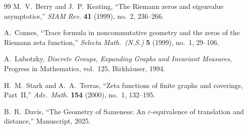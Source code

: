 \documentclass[12pt,reqno]{amsart}
\theoremstyle{plain}
\theoremstyle{definition}
\theoremstyle{remark}
\begin{document}
\begin{thebibliography}{99}
M.~V.~Berry and J.~P.~Keating,
``The Riemann zeros and eigenvalue asymptotics,''
\emph{SIAM Rev.} \textbf{41} (1999), no.~2, 236--266.

A.~Connes,
``Trace formula in noncommutative geometry and the zeros of the
Riemann zeta function,''
\emph{Selecta Math.~(N.S.)} \textbf{5} (1999), no.~1, 29--106.

A.~Lubotzky,
\emph{Discrete Groups, Expanding Graphs and Invariant Measures},
Progress in Mathematics, vol.~125, Birkh\"auser, 1994.

H.~M.~Stark and A.~A.~Terras,
``Zeta functions of finite graphs and coverings, Part~II,''
\emph{Adv.\ Math.} \textbf{154} (2000), no.~1, 132--195.

B.~R.~Davis,
``The Geometry of Sameness: An $\varepsilon$-equivalence of translation
and distance,''
Manuscript, 2025.

\end{thebibliography}
\end{document}
